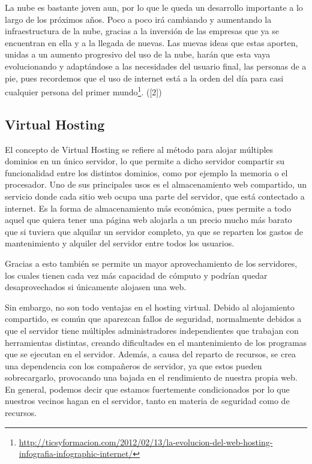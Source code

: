 \documentclass[a4paper, 10pt]{article} %
\begin{document}
La nube es bastante joven aun, por lo que le queda un desarrollo importante a lo largo de los próximos años. Poco a poco irá cambiando y aumentando la infraestructura de la nube, gracias a la inversión de las empresas que ya se encuentran en ella y a la llegada de nuevas. Las nuevas ideas que estas aporten, unidas a un aumento progresivo del uso de la nube, harán que esta vaya evolucionando y adaptándose a las necesidades del usuario final, las personas de a pie, pues recordemos que el uso de internet está a la orden del día para casi cualquier persona del primer mundo\footnote{\url{http://ticsyformacion.com/2012/02/13/la-evolucion-del-web-hosting-infografia-infographic-internet/}}. ([2])

\subsection{Virtual Hosting}

El concepto de Virtual Hosting se refiere al método para alojar múltiples dominios en un único servidor, lo que permite a dicho servidor compartir su funcionalidad entre los distintos dominios, como por ejemplo la memoria o el procesador. Uno de sus principales usos es el almacenamiento web compartido, un servicio donde cada sitio web ocupa una parte del servidor, que está contectado a internet. Es la forma de almacenamiento más económica, pues permite a todo aquel que quiera tener una página web alojarla a un precio mucho más barato que si tuviera que alquilar un servidor completo, ya que se reparten los gastos de mantenimiento y alquiler del servidor entre todos los usuarios. 

Gracias a esto también se permite un mayor aprovechamiento de los servidores, los cuales tienen cada vez más capacidad de cómputo y podrían quedar desaprovechados si únicamente alojasen una web. 

Sin embargo, no son todo ventajas en el hosting virtual. Debido al alojamiento compartido, es común que aparezcan fallos de seguridad, normalmente debidos a que el servidor tiene múltiples administradores independientes que trabajan con herramientas distintas, creando dificultades en el mantenimiento de los programas que se ejecutan en el servidor. Además, a causa del reparto de recursos, se crea una dependencia con los compañeros de servidor, ya que estos pueden sobrecargarlo, provocando una bajada en el rendimiento de nuestra propia web. En general, podemos decir que estamos fuertemente condicionados por lo que nuestros vecinos hagan en el servidor, tanto en materia de seguridad como de recursos. 
\end{document}
